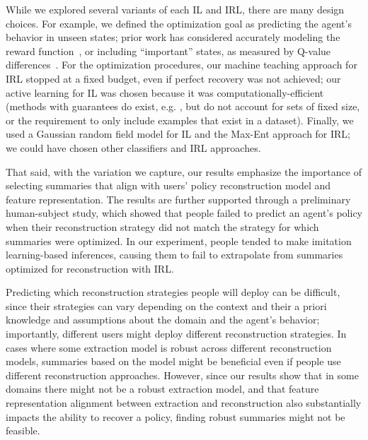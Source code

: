 \documentclass{article}
\begin{document}
While we explored several variants of each IL and IRL, there are many design choices. For example, we defined the optimization goal as predicting the agent's behavior in unseen states; prior work has considered accurately modeling the reward function~\cite{huang17communicate}, or including ``important'' states, as measured by Q-value differences~\cite{amir2018highlights, huang2018establishing}. For the optimization procedures, our machine teaching approach for IRL stopped at a fixed budget, even if perfect recovery was not achieved; our active learning for IL was chosen because it was computationally-efficient (methods with guarantees do exist, e.g. \cite{liu2016teaching}, but do not account for sets of fixed size, or the requirement to only include examples that exist in a dataset). Finally, we used a Gaussian random field model for IL and the Max-Ent approach for IRL; we could have chosen other classifiers and IRL approaches.


That said, with the variation we capture, our results emphasize the importance of selecting summaries that align with users' policy reconstruction model and feature representation. The results are further supported through a preliminary human-subject study, which showed that people failed to predict an agent's policy when their reconstruction strategy did not match the strategy for which summaries were optimized. In our experiment, people tended to make imitation learning-based inferences, causing them to fail to extrapolate from summaries optimized for reconstruction with IRL. 


Predicting which reconstruction strategies people will deploy can be difficult, since their strategies can vary depending on the context and their a priori knowledge and assumptions about the domain and the agent's behavior; importantly, different users might deploy different reconstruction strategies. In cases where some extraction model is robust across different reconstruction models, summaries based on the model might be beneficial even if people use different reconstruction approaches. However, since our results show that in some domains there might not be a robust extraction model, and that feature representation alignment between extraction and reconstruction also substantially impacts the ability to recover a policy, finding robust summaries might not be feasible.
\end{document}
